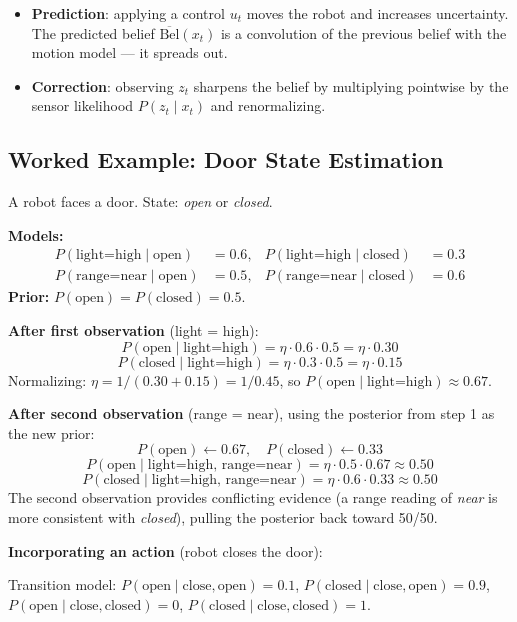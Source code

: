 \documentclass[11pt,a4paper]{article}
\theoremstyle{definition}
\theoremstyle{plain}
\theoremstyle{remark}
\begin{document}
\begin{itemize}
    \item \textbf{Prediction}: applying a control $u_t$ moves the robot and increases uncertainty. The predicted belief $\overline{\mathrm{Bel}}(x_t)$ is a convolution of the previous belief with the motion model — it spreads out.
    \item \textbf{Correction}: observing $z_t$ sharpens the belief by multiplying pointwise by the sensor likelihood $P(z_t \mid x_t)$ and renormalizing.
\end{itemize}

\subsection{Worked Example: Door State Estimation}

A robot faces a door. State: \textit{open} or \textit{closed}.

\textbf{Models:}
\begin{align*}
P(\text{light=high} \mid \text{open}) &= 0.6,  & P(\text{light=high} \mid \text{closed}) &= 0.3 \\
P(\text{range=near} \mid \text{open}) &= 0.5,  & P(\text{range=near} \mid \text{closed}) &= 0.6
\end{align*}
\textbf{Prior:} $P(\text{open}) = P(\text{closed}) = 0.5$.

\textbf{After first observation} (light = high):
\[
P(\text{open} \mid \text{light=high}) = \eta \cdot 0.6 \cdot 0.5 = \eta \cdot 0.30
\]
\[
P(\text{closed} \mid \text{light=high}) = \eta \cdot 0.3 \cdot 0.5 = \eta \cdot 0.15
\]
Normalizing: $\eta = 1/(0.30+0.15) = 1/0.45$, so $P(\text{open} \mid \text{light=high}) \approx 0.67$.

\textbf{After second observation} (range = near), using the posterior from step 1 as the new prior:
\[
P(\text{open}) \leftarrow 0.67,\quad P(\text{closed}) \leftarrow 0.33
\]
\[
P(\text{open} \mid \text{light=high, range=near}) = \eta \cdot 0.5 \cdot 0.67 \approx 0.50
\]
\[
P(\text{closed} \mid \text{light=high, range=near}) = \eta \cdot 0.6 \cdot 0.33 \approx 0.50
\]
The second observation provides conflicting evidence (a range reading of \textit{near} is more consistent with \textit{closed}), pulling the posterior back toward 50/50.

\textbf{Incorporating an action} (robot closes the door):

Transition model: $P(\text{open} \mid \text{close}, \text{open}) = 0.1$, $P(\text{closed} \mid \text{close}, \text{open}) = 0.9$, $P(\text{open} \mid \text{close}, \text{closed}) = 0$, $P(\text{closed} \mid \text{close}, \text{closed}) = 1$.
\end{document}
